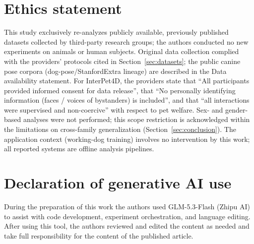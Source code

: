 \documentclass[a4paper,fleqn]{cas-sc}
\begin{document}

\section*{Ethics statement}
This study exclusively re-analyzes publicly available, previously published datasets collected by third-party research groups; the authors conducted no new experiments on animals or human subjects. Original data collection complied with the providers' protocols cited in Section~\ref{sec:datasets}; the public canine pose corpora (dog-pose/StanfordExtra lineage) are described in the Data availability statement. For InterPet4D, the providers state that ``All participants provided informed consent for data release'', that ``No personally identifying information (faces / voices of bystanders) is included'', and that ``all interactions were supervised and non-coercive'' with respect to pet welfare. Sex- and gender-based analyses were not performed; this scope restriction is acknowledged within the limitations on cross-family generalization (Section~\ref{sec:conclusion}). The application context (working-dog training) involves no intervention by this work; all reported systems are offline analysis pipelines.

\section*{Declaration of generative AI use}
During the preparation of this work the authors used GLM-5.3-Flash (Zhipu AI) to assist with code development, experiment orchestration, and language editing. After using this tool, the authors reviewed and edited the content as needed and take full responsibility for the content of the published article.
\end{document}
